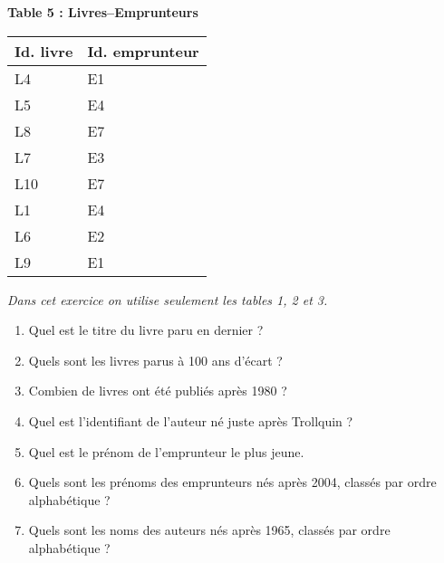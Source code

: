 \documentclass[class=report,crop=false, 12pt]{standalone}
\begin{document}
{\begin{center}
\begin{minipage}{0.3\textwidth}
\textbf{Table 5 : Livres--Emprunteurs}\\

\begin{tabular}{|l|l|} \hline
\textbf{Id. livre} & \textbf{Id. emprunteur}  \\ \hline\hline
L4 & E1 \\ \hline
L5 & E4 \\ \hline
L8 & E7 \\ \hline
L7 & E3 \\ \hline
L10 & E7 \\ \hline
L1 & E4 \\ \hline
L6 & E2 \\ \hline
L9 & E1 \\ \hline 
\end{tabular}
\end{minipage}
\end{center}
}


\bigskip

\begin{activite}
\emph{Dans cet exercice on utilise seulement les tables 1, 2 et 3.}

\begin{enumerate}
   \item Quel est le titre du livre paru en dernier ?
   \item Quels sont les livres parus à 100 ans d'écart ?
   \item Combien de livres ont été publiés après 1980 ?
   \item Quel est l'identifiant de l'auteur né juste après Trollquin ?   
   \item Quel est le prénom de l'emprunteur le plus jeune.    
   \item Quels sont les prénoms des emprunteurs nés après 2004, classés par ordre alphabétique ?
   \item Quels sont les noms des auteurs nés après 1965, classés par ordre alphabétique ?
\end{enumerate}

\end{activite}
\end{document}
